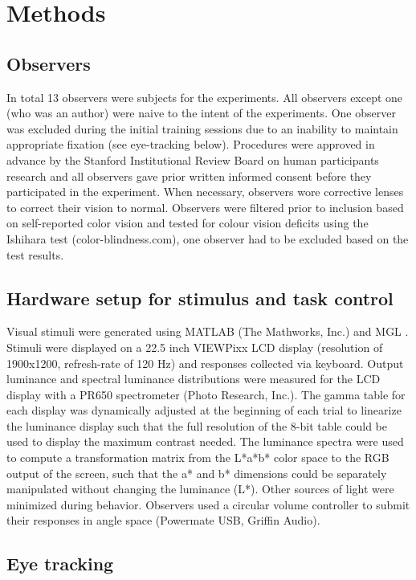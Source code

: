 \section{Methods}

\subsection{Observers}
In total 13 observers were subjects for the experiments. All observers except one (who was an author) were naive to the intent of the experiments. One observer was excluded during the initial training sessions due to an inability to maintain appropriate fixation (see eye-tracking below). Procedures were approved in advance by the Stanford Institutional Review Board on human participants research and all observers gave prior written informed consent before they participated in the experiment. When necessary, observers wore corrective lenses to correct their vision to normal. Observers were filtered prior to inclusion based on self-reported color vision and tested for colour vision deficits using the Ishihara test (color-blindness.com), one observer had to be excluded based on the test results. 

\subsection{Hardware setup for stimulus and task control}

Visual stimuli were generated using MATLAB (The Mathworks, Inc.) and MGL \citep{Gardner2018-uq}. Stimuli were displayed on a 22.5 inch VIEWPixx LCD display (resolution of 1900x1200, refresh-rate of 120 Hz) and responses collected via keyboard. Output luminance and spectral luminance distributions were measured for the LCD display with a PR650 spectrometer (Photo Research, Inc.). The gamma table for each display was dynamically adjusted at the beginning of each trial to linearize the luminance display such that the full resolution of the 8-bit table could be used to display the maximum contrast needed. The luminance spectra were used to compute a transformation matrix from the L*a*b* color space to the RGB output of the screen, such that the a* and b* dimensions could be separately manipulated without changing the luminance (L*). Other sources of light were minimized during behavior. Observers used a circular volume controller to submit their responses in angle space (Powermate USB, Griffin Audio).

\subsection{Eye tracking}

